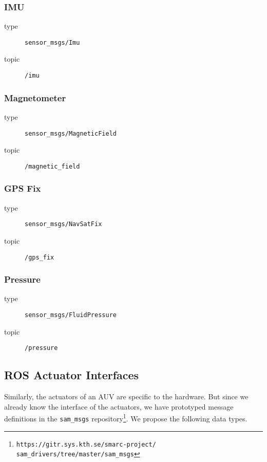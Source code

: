 \documentclass[9pt,technote]{IEEEtran} %
\begin{document}
\subsubsection{IMU}

\begin{description}
\item[type] \texttt{sensor\_msgs/Imu}
\item[topic] \texttt{/imu}
\end{description}

\subsubsection{Magnetometer}

\begin{description}
\item[type] \texttt{sensor\_msgs/MagneticField}
\item[topic] \texttt{/magnetic\_field}
\end{description}

\subsubsection{GPS Fix} 

\begin{description}
\item[type] \texttt{sensor\_msgs/NavSatFix}
\item[topic] \texttt{/gps\_fix}
\end{description}

\subsubsection{Pressure} 

\begin{description}
\item[type] \texttt{sensor\_msgs/FluidPressure}
\item[topic] \texttt{/pressure}
\end{description}

\subsection{ROS Actuator Interfaces}

Similarly, the actuators of an AUV are specific to the hardware.
But since we already know the interface of the actuators, we
have prototyped message definitions in the \texttt{sam\_msgs}
repository\footnote{\texttt{https://gitr.sys.kth.se/smarc-project/\\sam\_drivers/tree/master/sam\_msgs}}.
We propose the following data types.
\end{document}
